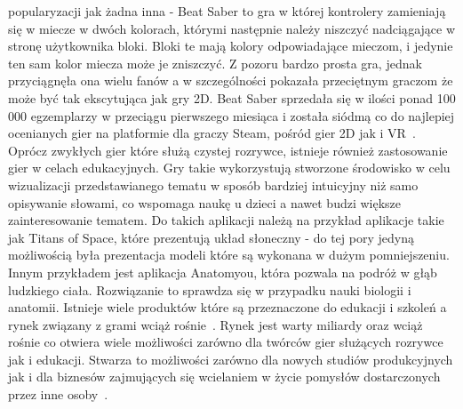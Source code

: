 popularyzacji jak żadna inna - Beat Saber to gra w której kontrolery zamieniają się w miecze w dwóch kolorach, którymi następnie należy niszczyć nadciągające w stronę użytkownika bloki. Bloki te mają kolory odpowiadające mieczom, i jedynie ten sam kolor miecza może je zniszczyć. Z pozoru bardzo prosta gra, jednak przyciągnęła ona wielu fanów a w szczególności pokazała przeciętnym graczom że może być tak ekscytująca jak gry 2D. Beat Saber sprzedała się w ilości ponad 100 000 egzemplarzy w przeciągu pierwszego miesiąca i została siódmą co do najlepiej ocenianych gier na platformie dla graczy Steam, pośród gier 2D jak i VR~\cite{gry2}. 
Oprócz zwykłych gier które służą czystej rozrywce, istnieje również zastosowanie gier w celach edukacyjnych. Gry takie wykorzystują stworzone środowisko w celu wizualizacji przedstawianego tematu w sposób bardziej intuicyjny niż samo opisywanie słowami, co wspomaga naukę u dzieci a nawet budzi większe zainteresowanie tematem. Do takich aplikacji należą na przykład aplikacje takie jak  Titans of Space, które prezentują układ słoneczny - do tej pory jedyną możliwością była prezentacja modeli które są wykonana w dużym pomniejszeniu. Innym przykładem jest aplikacja Anatomyou, która pozwala na podróż w głąb ludzkiego ciała. Rozwiązanie to sprawdza się w przypadku nauki biologii i anatomii. Istnieje wiele produktów które są przeznaczone do edukacji i szkoleń a rynek związany z grami wciąż rośnie~\cite{gry3}. Rynek jest warty miliardy oraz wciąż rośnie co otwiera wiele możliwości zarówno dla twórców gier służących rozrywce jak i edukacji. Stwarza to możliwości zarówno dla nowych studiów produkcyjnych jak i dla biznesów zajmujących się wcielaniem w życie pomysłów dostarczonych przez inne osoby~\cite{gry1}.